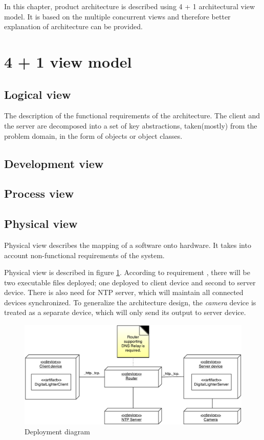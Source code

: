 In this chapter, product architecture is described using 4 + 1 architectural view model.
It is based on the multiple concurrent views and therefore better explanation of architecture can be provided.

\section{4 + 1 view model}
\subsection{Logical view}
The description of the functional requirements of the architecture. The client and the server are decomposed into a set of key abstractions, taken(mostly) from the problem domain, in the form of objects or object classes.
\subsection{Development view}
\subsection{Process view}
\subsection{Physical view}
Physical view \cite{Kruchten:1995:VMA:624610.625529} describes the mapping of a software onto hardware. 
It takes into account non-functional requirements of the system.

Physical view is described in figure \ref{fig:architecture_deployment_diagram}.
According to requirement , there will be two executable files deployed; one deployed to client device and second to server device.
There is also need for NTP server, which will maintain all connected devices synchronized.
To generalize the architecture design, the \emph{camera} device is treated as a separate device, which will only send its output to server device.
\begin{figure}[H]
	\centering
		\includegraphics[width=15cm]{softwareArchitecture/deployment-diagram.pdf}
	\caption{Deployment diagram}
	\label{fig:architecture_deployment_diagram}
\end{figure}
